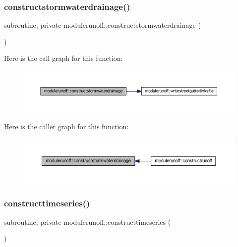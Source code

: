 \subsubsection{\texorpdfstring{constructstormwaterdrainage()}{constructstormwaterdrainage()}}
{\footnotesize\ttfamily subroutine, private modulerunoff\+::constructstormwaterdrainage (\begin{DoxyParamCaption}{ }\end{DoxyParamCaption})\hspace{0.3cm}{\ttfamily [private]}}

Here is the call graph for this function\+:
\nopagebreak
\begin{figure}[H]
\begin{center}
\leavevmode
\includegraphics[width=350pt]{namespacemodulerunoff_a03335615cccffdf4fcbc7979c2e2b299_cgraph}
\end{center}
\end{figure}
Here is the caller graph for this function\+:
\nopagebreak
\begin{figure}[H]
\begin{center}
\leavevmode
\includegraphics[width=350pt]{namespacemodulerunoff_a03335615cccffdf4fcbc7979c2e2b299_icgraph}
\end{center}
\end{figure}
\mbox{\label{namespacemodulerunoff_a38585735a1deed54aec387488350fd0d}} 
\subsubsection{\texorpdfstring{constructtimeseries()}{constructtimeseries()}}
{\footnotesize\ttfamily subroutine, private modulerunoff\+::constructtimeseries (\begin{DoxyParamCaption}{ }\end{DoxyParamCaption})\hspace{0.3cm}{\ttfamily [private]}}

